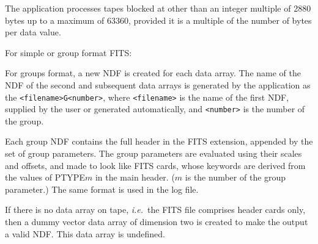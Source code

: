 {{{{         \sstitem
         The application processes tapes blocked at other than an
         integer multiple of 2880 bytes up to a maximum of 63360, provided
         it is a multiple of the number of bytes per data value.

         \sstitem
         For simple or group format FITS:


         \sstitem
         For groups format, a new NDF is created for each data array.
         The name of the NDF of the second and subsequent data arrays is
         generated by the application as the {\tt <filename>G<number>}, where
         {\tt <filename>} is the name of the first NDF, supplied by the user or
         generated automatically, and {\tt <number>} is the number of the group.

         Each group NDF contains the full header in the FITS extension,
         appended by the set of group parameters.  The group parameters
         are evaluated using their scales and offsets, and made to look
         like FITS cards, whose keywords are derived from the values of
         PTYPE$m$ in the main header.  ($m$ is the number of the group
         parameter.) The same format is used in the log file.

         \sstitem
         If there is no data array on tape, {\it i.e.}\ the FITS file comprises
         header cards only, then a dummy vector data array of dimension
         two is created to make the output a valid NDF.  This data array
         is undefined.
      }
   }
}
 
}
